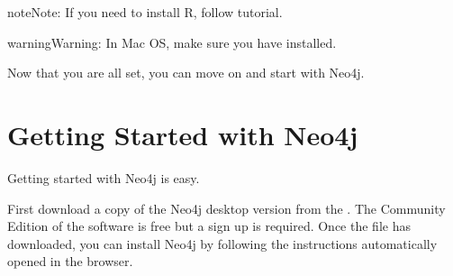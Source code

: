 \documentclass[letterpaper,10pt,english]{sphinxmanual}
\begin{document}
\begin{sphinxVerbatim}[commandchars=\\\{\}]
   
   
\end{sphinxVerbatim}

\begin{sphinxadmonition}{note}{Note:}
If you need to install R, follow  tutorial.
\end{sphinxadmonition}

\begin{sphinxadmonition}{warning}{Warning:}
In Mac OS, make sure you have  installed.
\end{sphinxadmonition}

Now that you are all set, you can move on and start with Neo4j.


\section{Getting Started with Neo4j}
\label{\detokenize{intro/getting-started-with-neo4j:getting-started-with-neo4j}}\label{\detokenize{intro/getting-started-with-neo4j:id1}}\label{\detokenize{intro/getting-started-with-neo4j::doc}}
Getting started with Neo4j is easy.

First download a copy of the Neo4j desktop version from the .
The Community Edition of the software is free but a sign up is required.
Once the file has downloaded, you can install Neo4j by following the instructions automatically opened in the browser.
\end{document}
